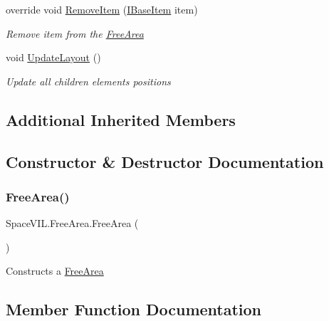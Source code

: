 \begin{DoxyCompactItemize}
override void \mbox{\hyperlink{class_space_v_i_l_1_1_free_area_ae9b39df00c0fa786b4072b8e49e3aacc}{Remove\+Item}} (\mbox{\hyperlink{interface_space_v_i_l_1_1_core_1_1_i_base_item}{I\+Base\+Item}} item)
\begin{DoxyCompactList}\small\item\em Remove item from the \mbox{\hyperlink{class_space_v_i_l_1_1_free_area}{Free\+Area}} \end{DoxyCompactList}\item 
void \mbox{\hyperlink{class_space_v_i_l_1_1_free_area_a88f3dc2645275f25f2fae769e7a1423a}{Update\+Layout}} ()
\begin{DoxyCompactList}\small\item\em Update all children elements positions \end{DoxyCompactList}\end{DoxyCompactItemize}
\subsection*{Additional Inherited Members}


\subsection{Constructor \& Destructor Documentation}
\mbox{\label{class_space_v_i_l_1_1_free_area_a66c2dcb40e9cacde8f342c20a5193d96}} 
\subsubsection{\texorpdfstring{Free\+Area()}{FreeArea()}}
{\footnotesize\ttfamily Space\+V\+I\+L.\+Free\+Area.\+Free\+Area (\begin{DoxyParamCaption}{ }\end{DoxyParamCaption})\hspace{0.3cm}{\ttfamily [inline]}}



Constructs a \mbox{\hyperlink{class_space_v_i_l_1_1_free_area}{Free\+Area}} 



\subsection{Member Function Documentation}
\mbox{\label{class_space_v_i_l_1_1_free_area_af8b1aa9fc2390fb36a34b6bf4d1ef76a}} 
